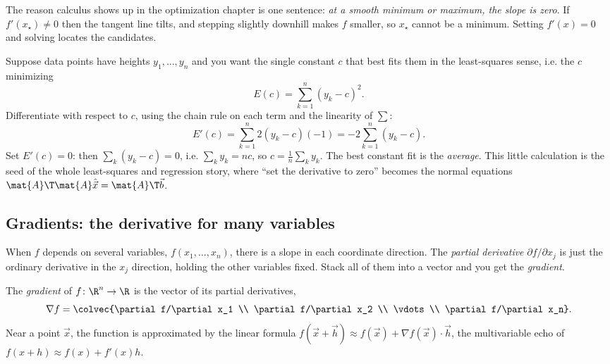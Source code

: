 The reason calculus shows up in the optimization chapter is one sentence: \emph{at a smooth minimum
or maximum, the slope is zero}. If $f'(x_\star) \ne 0$ then the tangent line tilts, and stepping
slightly downhill makes $f$ smaller, so $x_\star$ cannot be a minimum. Setting $f'(x) = 0$ and
solving locates the candidates.

\begin{example}
\label{ch39:ex-leastsq}
Suppose data points have heights $y_1, \dots, y_n$ and you want the single constant $c$ that best
fits them in the least-squares sense, i.e. the $c$ minimizing
\[
E(c) = \sum_{k=1}^{n} (y_k - c)^2.
\]
Differentiate with respect to $c$, using the chain rule on each term and the linearity of $\sum$:
\[
E'(c) = \sum_{k=1}^{n} 2(y_k - c)(-1) = -2\sum_{k=1}^{n}(y_k - c).
\]
Set $E'(c) = 0$: then $\sum_k (y_k - c) = 0$, i.e. $\sum_k y_k = nc$, so $c = \frac1n\sum_k y_k$.
The best constant fit is the \emph{average}. This little calculation is the seed of the whole
least-squares and regression story, where ``set the derivative to zero'' becomes the normal
equations $\mat{A}\T\mat{A}\hat{\vec{x}} = \mat{A}\T\vec{b}$.
\end{example}

\subsection{Gradients: the derivative for many variables}
\label{ch39:gradient}

When $f$ depends on several variables, $f(x_1, \dots, x_n)$, there is a slope in each coordinate
direction. The \emph{partial derivative} $\partial f/\partial x_j$ is just the ordinary derivative in
the $x_j$ direction, holding the other variables fixed. Stack all of them into a vector and you get
the \emph{gradient}.

\begin{formalbox}
The \emph{gradient} of $f\colon \R^n \to \R$ is the vector of its partial derivatives,
\[
\nabla f = \colvec{\partial f/\partial x_1 \\ \partial f/\partial x_2 \\ \vdots \\ \partial f/\partial x_n}.
\]
Near a point $\vec{x}$, the function is approximated by the linear formula $f(\vec{x} + \vec{h})
\approx f(\vec{x}) + \nabla f(\vec{x})\cdot \vec{h}$, the multivariable echo of $f(x+h)\approx f(x) +
f'(x)h$.
\end{formalbox}

